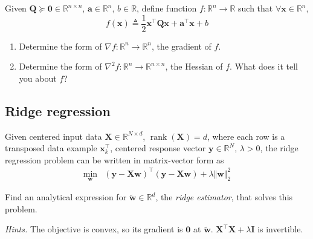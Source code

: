 \documentclass{article}
\numberwithin{equation}{section}
\begin{document}
Given $ \mathbf{Q} \succeq \mathbf{0} \in \mathbb{R}^{n \times n} $,
$ \mathbf{a} \in \mathbb{R}^n $, $ b \in \mathbb{R} $, define function
$ f : \mathbb{R}^n \rightarrow \mathbb{R} $ such that $ \forall \mathbf{x} \in
\mathbb{R}^n $,
\begin{equation*}
    f(\mathbf{x}) \triangleq \frac{1}{2}\mathbf{x}^\top\mathbf{Qx} +
    \mathbf{a}^\top\mathbf{x} + b
\end{equation*}

\begin{enumerate}[label = \alph*.]
    \item
    Determine the form of $ \nabla f : \mathbb{R}^n \rightarrow
    \mathbb{R}^n $, the gradient of $ f $.

    \item
    Determine the form of $ \nabla^2f : \mathbb{R}^n \rightarrow
    \mathbb{R}^{n \times n} $, the Hessian of $ f $. What does it tell you
    about $ f $?
\end{enumerate}

\subsection{Ridge regression}

Given centered input data $ \mathbf{X} \in \mathbb{R}^{N \times d} $,
$ \operatorname{rank}(\mathbf{X}) = d $, where each row is a transposed data
example $ \mathbf{x}_k^\top $, centered response vector
$ \mathbf{y} \in \mathbb{R}^N $, $ \lambda > 0 $, the ridge regression problem
can be written in matrix-vector form as
\begin{equation*}
    \begin{array}{ll}
        \displaystyle\min_\mathbf{w} &
        (\mathbf{y} - \mathbf{Xw})^\top(\mathbf{y} - \mathbf{Xw}) +
        \lambda\Vert\mathbf{w}\Vert_2^2
    \end{array}
\end{equation*}

Find an analytical expression for $ \tilde{\mathbf{w}} \in \mathbb{R}^d $, the
\textit{ridge estimator}, that solves this problem.

\medskip

\textit{Hints.} The objective is convex, so its gradient is $ \mathbf{0} $ at
$ \tilde{\mathbf{w}} $. $ \mathbf{X}^\top\mathbf{X} + \lambda\mathbf{I} $ is
invertible.



\end{document}
